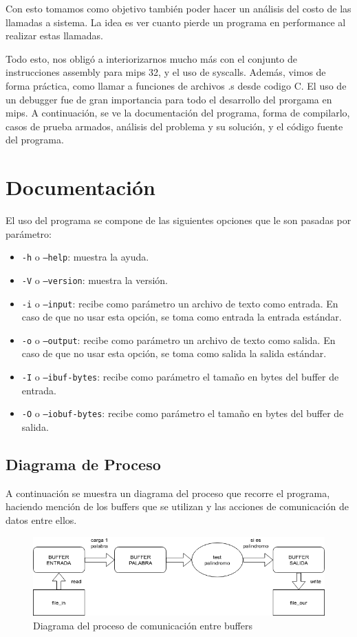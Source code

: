 \documentclass[11pt,a4paper]{article}
\begin{document}
Con esto tomamos como objetivo también poder hacer un análisis del costo de las llamadas a sistema. La idea es ver cuanto pierde un programa en performance al realizar estas llamadas.

Todo esto, nos obligó a interiorizarnos mucho más con el conjunto de instrucciones assembly para mips 32, y el uso de syscalls. Además, vimos de forma práctica, como llamar a funciones de archivos .s desde codigo C. El uso de un debugger fue de gran importancia para todo el desarrollo del prorgama en mips.
A continuación, se ve la documentación del programa, forma de compilarlo, casos de prueba armados, análisis del problema y su solución, y el código fuente del programa.

\section{Documentación}
El uso del programa se compone de las siguientes opciones que le son pasadas por parámetro:
\begin{itemize}
	\item \texttt{-h} o \texttt{--help}: muestra la ayuda.
	\item \texttt{-V} o \texttt{--version}: muestra la versión.
	\item \texttt{-i} o \texttt{--input}: recibe como parámetro un archivo de texto como entrada. En caso de que no usar esta opción, se toma como entrada la entrada estándar.
	\item \texttt{-o} o \texttt{--output}: recibe como parámetro un archivo de texto como salida. En caso de que no usar esta opción, se toma como salida la salida estándar.
	\item \texttt{-I} o \texttt{--ibuf-bytes}: recibe como parámetro el tamaño en bytes del buffer de entrada.
	\item \texttt{-O} o \texttt{--iobuf-bytes}: recibe como parámetro el tamaño en bytes del buffer de salida.
	
\end{itemize}

\subsection{Diagrama de Proceso}
A continuación se muestra un diagrama del proceso que recorre el programa, haciendo mención de los buffers que se utilizan y las acciones de comunicación de datos entre ellos.

\begin{figure}[H]
	\centering	
	\includegraphics[width=\textwidth]{diagra_proceso}
	\caption{Diagrama del proceso de comunicación entre buffers}
\end{figure}
\end{document}
